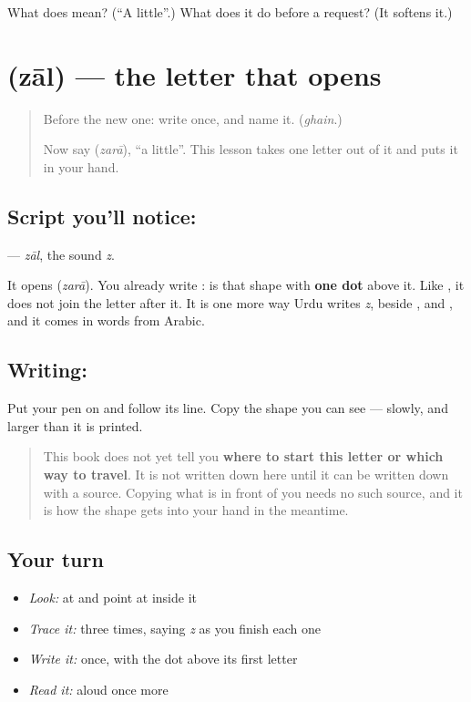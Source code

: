 \begin{tcolorbox}[breakable,colback=teal!4,colframe=teal!35!black,title={Before you move on}]
What does \textbf{} mean? (\textquotedblleft{}A little\textquotedblright{}.) What does it do before a request? (It softens it.)
\end{tcolorbox}
\section[\texorpdfstring{\ur{ذ} (zāl)}{ذ (zāl)}]{ (zāl) — the letter that opens }

\label{lesson:UR-W270-zal}



\begin{quote}
Before the new one: write  once, and name it. (\emph{ghain}.)

Now say \textbf{} (\emph{zarā}), \textquotedblleft{}a little\textquotedblright{}. This lesson takes one letter out of it and puts it in your hand.
\end{quote}

\subsection*{Script you'll notice: }
\textbf{} — \emph{zāl}, the sound \emph{z}.

It opens \textbf{} (\emph{zarā}). You already write \textbf{}: \textbf{} is that shape with \textbf{one dot} above it. Like \textbf{}, it does not join the letter after it. It is one more way Urdu writes \emph{z}, beside \textbf{}, \textbf{} and \textbf{}, and it comes in words from Arabic.

\subsection*{Writing: }
Put your pen on  and follow its line. Copy the shape you can see — slowly, and larger than it is printed.

\begin{quote}
This book does not yet tell you \textbf{where to start this letter or which way to travel}. It is not written down here until it can be written down with a source. Copying what is in front of you needs no such source, and it is how the shape gets into your hand in the meantime.
\end{quote}

\subsection*{Your turn}
\begin{itemize}
\raggedright
  \item \emph{Look:} at \textbf{} and point at  inside it
  \item \emph{Trace it:}  three times, saying \emph{z} as you finish each one
  \item \emph{Write it:} \textbf{} once, with the dot above its first letter
  \item \emph{Read it:} \textbf{} aloud once more
\end{itemize}

